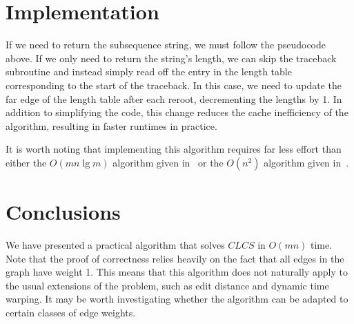 \documentclass{article}
\begin{document}
\section{Implementation}

If we need to return the subsequence string, we must follow the pseudocode above.  If we only need to return the string's length, we can skip the traceback subroutine and instead simply read off the entry in the length table corresponding to the start of the traceback.  In this case, we need to update the far edge of the length table after each reroot, decrementing the lengths by 1.  In addition to simplifying the code, this change reduces the cache inefficiency of the algorithm, resulting in faster runtimes in practice.

It is worth noting that implementing this algorithm requires far less effort than either the $O(mn \lg m)$ algorithm given in~\cite{M90} or the $O(n^2)$ algorithm given in~\cite{LMS98}.

\section{Conclusions}

We have presented a practical algorithm that solves $CLCS$ in $O(mn)$ time.  Note that the proof of correctness relies heavily on the fact that all edges in the graph have weight 1.  This means that this algorithm does not naturally apply to the usual extensions of the problem, such as edit distance and dynamic time warping.  It may be worth investigating whether the algorithm can be adapted to certain classes of edge weights.


\end{document}
